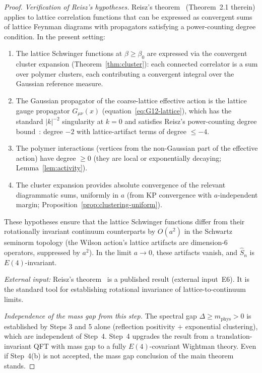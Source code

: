 \documentclass[11pt]{article}
\theoremstyle{definition}
\begin{document}
\begin{proof}
\emph{Verification of Reisz's hypotheses.}
Reisz's theorem~\cite{Reisz1988} (Theorem~2.1 therein) applies to
lattice correlation functions that can be expressed as convergent
sums of lattice Feynman diagrams with propagators satisfying
a power-counting degree condition.  In the present setting:
\begin{enumerate}[nosep,label=(\alph*)]
\item The lattice Schwinger functions at $\beta\ge\beta_0$ are
expressed via the convergent cluster expansion
(Theorem~\ref{thm:cluster}): each connected correlator is
a sum over polymer clusters, each contributing a convergent
integral over the Gaussian reference measure.
\item The Gaussian propagator of the coarse-lattice effective
action is the lattice gauge propagator $G_{\mu\nu}(x)$
(equation~\eqref{eq:G12-lattice}), which has the standard
$|k|^{-2}$ singularity at $k=0$ and satisfies Reisz's
power-counting degree bound~\cite{Reisz1988}: degree $-2$
with lattice-artifact terms of degree $\le -4$.
\item The polymer interactions (vertices from the non-Gaussian
part of the effective action) have degree $\ge 0$
(they are local or exponentially decaying;
Lemma~\ref{lem:activity}).
\item The cluster expansion provides absolute convergence
of the relevant diagrammatic sums, uniformly in $a$
(from KP convergence with $a$-independent margin;
Proposition~\ref{prop:clustering-uniform}).
\end{enumerate}
These hypotheses ensure that the lattice Schwinger functions
differ from their rotationally invariant continuum counterparts
by $O(a^2)$ in the Schwartz seminorm topology
(the Wilson action's lattice artifacts are dimension-6
operators, suppressed by $a^2$).
In the limit $a\to 0$, these artifacts vanish, and
$\hat S_n$ is $E(4)$-invariant.

\emph{External input:}
Reisz's theorem~\cite{Reisz1988} is a published result
(external input~E6).  It is the standard
tool for establishing rotational invariance of
lattice-to-continuum limits.

\emph{Independence of the mass gap from this step.}
The spectral gap $\Delta\ge m_{\mathrm{phys}}>0$
is established by Steps 3 and 5 alone
(reflection positivity $+$ exponential clustering),
which are independent of Step~4.
Step~4 upgrades the result from a
translation-invariant QFT with mass gap to a
fully $E(4)$-covariant Wightman theory.
Even if Step~4(b) is not accepted, the mass gap
conclusion of the main theorem stands.


\end{proof}
\end{document}
